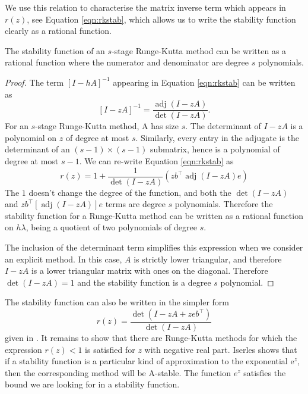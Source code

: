We use this relation to characterise the matrix inverse term which appears in $r(z)$, see Equation \ref{eqn:rkstab},
which allows us to write the stability function clearly as a rational function.
\begin{lemma}
	\label{lem:stabfrk}
	The stability function of an $s$-stage Runge-Kutta method can be written as a rational function where the numerator and denominator are degree $s$ polynomials.
\end{lemma}
\begin{proof}
	The term $[I-hA]^{-1}$ appearing in Equation \ref{eqn:rkstab} can be written as
	\begin{equation*}
		\left[I - zA\right]^{-1} = \frac{\operatorname{adj}(I-zA)}{\det(I-zA)}.
	\end{equation*}
	For an $s$-stage Runge-Kutta method, A has size $s$.
	The determinant of $I-zA$ is a polynomial on $z$ of degree at most $s$.
	Similarly, every entry in the adjugate is the determinant of an $(s-1)\times(s-1)$ submatrix,
	hence is a polynomial of degree at most $s-1$.
	We can re-write Equation \ref{eqn:rkstab} as
	\begin{equation*}
		r(z) = 1 + \frac{1}{\det(I-zA)}\left( z b^\top \operatorname{adj}(I-zA) e \right)
	\end{equation*} 
	The $1$ doesn't change the degree of the function, and both the $\det(I-zA)$ and $z b^\top \left[ \operatorname{adj}(I-zA) \right] e$ terms are degree $s$ polynomials.
	Therefore the stability function for a Runge-Kutta method can be written as a rational function on $h \lambda$,
	being a quotient of two polynomials of degree $s$.
	
	The inclusion of the determinant term simplifies this expression when we consider an explicit method.
	In this case, $A$ is strictly lower triangular, and therefore $I-zA$ is a lower triangular matrix with ones on the diagonal.
	Therefore $\det(I-zA) = 1$ and the stability function is a degree $s$ polynomial. 
\end{proof}
The stability function can also be written in the simpler form
\begin{equation}
	r(z) = \frac{\det(I - z A + z eb^\top)}{\det(I - z A)}
	\label{eqn:stabrk2}
\end{equation}
given in \cite{iserles2009rk}.
It remains to show that there are Runge-Kutta methods for which the expression $r(z)<1$ is satisfied for $z$ with negative real part.
Iserles shows that if a stability function is a particular kind of approximation to the exponential $\mathrm{e}^z$, then the corresponding method will be A-stable.
The function $e^z$ satisfies the bound we are looking for in a stability function.

